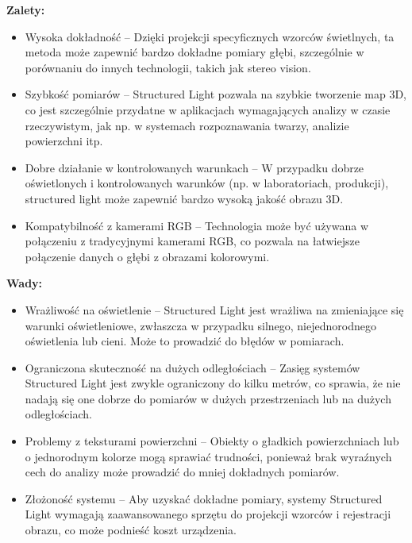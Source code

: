 \documentclass[magisterska]{pracadypl}
\begin{document}
\begin{minipage}[t]{0.45\textwidth}
\textbf{Zalety:}
\begin{itemize}
  \item Wysoka dokładność – Dzięki projekcji specyficznych wzorców świetlnych, ta metoda może zapewnić bardzo dokładne pomiary głębi, szczególnie w porównaniu do innych technologii, takich jak stereo vision.

  \item Szybkość pomiarów – Structured Light pozwala na szybkie tworzenie map 3D, co jest szczególnie przydatne w aplikacjach wymagających analizy w czasie rzeczywistym, jak np. w systemach rozpoznawania twarzy, analizie powierzchni itp.

  \item Dobre działanie w kontrolowanych warunkach – W przypadku dobrze oświetlonych i kontrolowanych warunków (np. w laboratoriach, produkcji), structured light może zapewnić bardzo wysoką jakość obrazu 3D.

  \item Kompatybilność z kamerami RGB – Technologia może być używana w połączeniu z tradycyjnymi kamerami RGB, co pozwala na łatwiejsze połączenie danych o głębi z obrazami kolorowymi.
\end{itemize}
\end{minipage}
\hfill
\begin{minipage}[t]{0.45\textwidth}
\textbf{Wady:}
\begin{itemize}
  \item Wrażliwość na oświetlenie – Structured Light jest wrażliwa na zmieniające się warunki oświetleniowe, zwłaszcza w przypadku silnego, niejednorodnego oświetlenia lub cieni. Może to prowadzić do błędów w pomiarach.

  \item Ograniczona skuteczność na dużych odległościach – Zasięg systemów Structured Light jest zwykle ograniczony do kilku metrów, co sprawia, że nie nadają się one dobrze do pomiarów w dużych przestrzeniach lub na dużych odległościach.

  \item Problemy z teksturami powierzchni – Obiekty o gładkich powierzchniach lub o jednorodnym kolorze mogą sprawiać trudności, ponieważ brak wyraźnych cech do analizy może prowadzić do mniej dokładnych pomiarów.

  \item Złożoność systemu – Aby uzyskać dokładne pomiary, systemy Structured Light wymagają zaawansowanego sprzętu do projekcji wzorców i rejestracji obrazu, co może podnieść koszt urządzenia.
\end{itemize}
\end{minipage}
\end{document}
